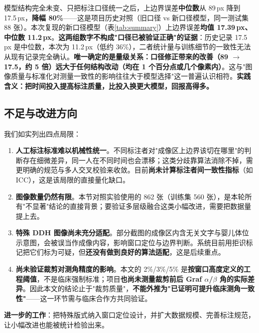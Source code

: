 \documentclass[UTF8,a4paper,10pt]{ctexart}
\begin{document}
\noindent 模型结构完全未变、只把标注口径统一之后，上边界误差\textbf{中位数}从 89\,px 降到 17.5\,px，\textbf{降幅 80\%}——这是项目历史对照（旧口径 vs 新口径模型，同一测试集 88 张）。本次复现的新口径模型（表\ref{tab:summary}）上边界误差\textbf{均值 17.39\,px、中位数 11.2\,px}。\textbf{这两组数字不构成"口径已被验证正确"的证据}：历史记录 17.5\,px 是中位数，本次为 11.2\,px（低约 36\%），二者统计量与训练细节的一致性无法从现有记录完全确认。\textbf{唯一确定的是量级关系：口径修正带来的改善（89 $\rightarrow$ 17.5，约 5 倍）远大于任何结构改动（均在 1 个百分点或几个像素内）}。这与"图像质量与标准化对测量一致性的影响往往大于模型选择"这一普遍认识\cite{yu2021qualitycontrol}相符。\textbf{实践含义：把时间投入提高标注质量，比投入换更大模型，回报高得多。}





\subsection{不足与改进方向}

\noindent 我们如实列出四点局限：

\begin{enumerate}[leftmargin=1.6em,itemsep=2pt,topsep=2pt]
\item \textbf{人工标注标准难以机械性统一}。不同标注者对"成像区上边界该切在哪里"的判断存在细微差异，同一人在不同时间也会漂移；这类分歧靠算法消除不掉，需更明确的规范与多人交叉校验来收敛。目前\textbf{尚未计算标注者间一致性指标}（如 ICC），这是该局限的直接量化缺口。
\item \textbf{图像数量仍然有限}。本节对照实验使用的 862 张（训练集 560 张），是本轮所有"不显著"结论的直接背景；要验证多层级融合这类小幅改进，需要把数据量提上去。
\item \textbf{特殊 DDH 图像尚未充分适配}。部分截图的成像区内含无关文字与婴儿体位示意图，会被误当作成像内容，影响窗口定位与边界判断。系统目前用拒识标记把它们标为可疑，但\textbf{还没有做到良好的算法适配}，这是后续重点。
\item \textbf{尚未验证裁剪对测角精度的影响}。本文的 2\%/3\%/5\% 是\textbf{按窗口高度定义的工程阈值}，不是临床强制标准；项目\textbf{也尚未测量裁剪前后 Graf $\alpha$/$\beta$ 角的实际差异}。因此本文的结论止于"裁剪质量"，\textbf{不能外推为"已证明可提升临床测角一致性"}——这一环节需与临床合作方共同验证。
\end{enumerate}

\noindent\textbf{进一步的工作}：把特殊版式纳入窗口定位设计，并扩大数据规模、完善标注规范，让小幅改进也能被统计检验出来。
\end{document}
